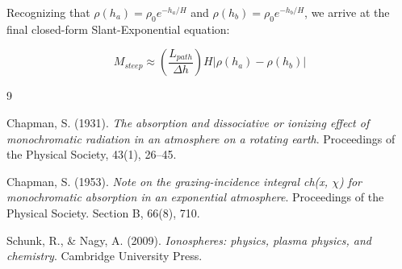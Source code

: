 ﻿\documentclass[12pt,a4paper]{article}
\begin{document}
Recognizing that $\rho(h_a) = \rho_0 e^{-h_a/H}$ and $\rho(h_b) = \rho_0 e^{-h_b/H}$, we arrive at the final closed-form Slant-Exponential equation:

\begin{equation}
M_{steep} \approx \left( \frac{L_{path}}{\Delta h} \right) H \left| \rho(h_a) - \rho(h_b) \right|
\end{equation}

\begin{thebibliography}{9}

Chapman, S. (1931). 
\emph{The absorption and dissociative or ionizing effect of monochromatic radiation in an atmosphere on a rotating earth}. 
Proceedings of the Physical Society, 43(1), 26–45.

Chapman, S. (1953). 
\emph{Note on the grazing-incidence integral ch(x, $\chi$) for monochromatic absorption in an exponential atmosphere}. 
Proceedings of the Physical Society. Section B, 66(8), 710.

Schunk, R., \& Nagy, A. (2009). 
\emph{Ionospheres: physics, plasma physics, and chemistry}. 
Cambridge University Press.

\end{thebibliography}
\end{document}
